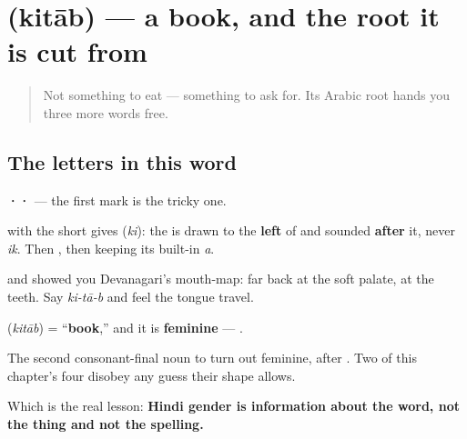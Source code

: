 \section[\texorpdfstring{\hi{किताब} / \hi{पुस्तक} … (kitāb / pustak …)}{किताब / पुस्तक … (kitāb / pustak …)}]{ (kitāb) — a book, and the root it is cut from}

\label{lesson:HI-C37-kitaab}



\begin{quote}
Not something to eat — something to ask for. Its Arabic root hands you three more words free.
\end{quote}

\subsection*{The letters in this word}
\textbf{··} — the first mark is the tricky one.

\textbf{} with the short \textbf{} gives \textbf{} (\emph{ki}): the \textbf{} is drawn to the \textbf{left} of \textbf{} and sounded \textbf{after} it, never \emph{ik}. Then \textbf{}, then \textbf{} keeping its built-in \emph{a}.

\textbf{} and \textbf{} showed you Devanagari's mouth-map: \textbf{} far back at the soft palate, \textbf{} at the teeth. Say \emph{ki-tā-b} and feel the tongue travel.

\begin{grammarlens}[title={Grammar Lens: feminine, and no ending to prove it}]
\textbf{} (\emph{kitāb}) = \textquotedblleft{}\textbf{book},\textquotedblright{} and it is \textbf{feminine} — \textbf{ }.

The second consonant-final noun to turn out feminine, after \textbf{}. Two of this chapter's four disobey any guess their shape allows.

Which is the real lesson: \textbf{Hindi gender is information about the word, not the thing and not the spelling.}
\end{grammarlens}


